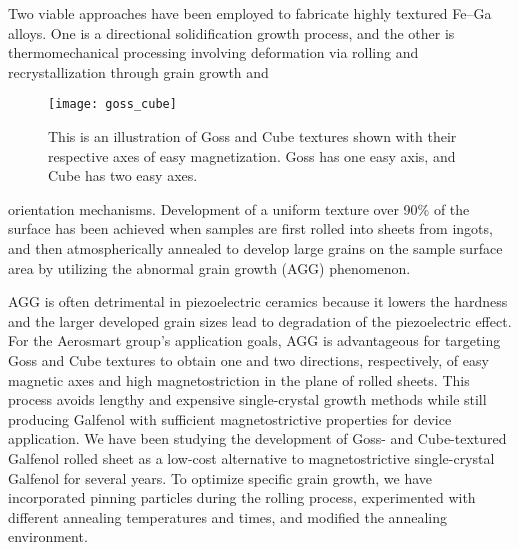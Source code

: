 Two viable approaches have been employed to fabricate highly textured Fe–Ga alloys\cite{srisukhumbowornchai2001large,kellogg2003texture}. One is a directional solidification growth process, and the other is thermomechanical processing involving deformation via rolling and recrystallization through grain growth and  
\begin{figure}[h]
	\centering
	\texttt{[image: goss\_cube]}
	\caption{This is an illustration of Goss and Cube textures shown with their respective axes of easy magnetization. Goss has one easy axis, and Cube has two easy axes.}
	\label{fig:goss_cube}	
\end{figure}
 orientation mechanisms. Development of a uniform texture over 90\% of the surface has been achieved when samples are first rolled into sheets from ingots, and then atmospherically annealed to develop large grains on the sample surface area by utilizing the abnormal grain growth (AGG) phenomenon.\cite{Na2012a,Na2014}


 AGG is often detrimental in piezoelectric ceramics because it lowers the hardness and the larger developed grain sizes lead to degradation of the piezoelectric effect.\cite{Bing2014} For the Aerosmart group's application goals, AGG is advantageous for targeting Goss  and Cube  textures to obtain one and two directions, respectively, of easy magnetic axes and high magnetostriction in the plane of rolled sheets. This process avoids lengthy and expensive single-crystal growth methods while still producing Galfenol with sufficient magnetostrictive properties for device application. We have been studying the development of Goss- and Cube-textured Galfenol rolled sheet as a low-cost alternative to magnetostrictive single-crystal Galfenol for several years. To optimize specific grain growth, we have  incorporated pinning particles during the rolling process, experimented with different annealing temperatures and times, and modified the annealing environment.\cite{Na2007b,Na2008,Na2009,Na2012} 

